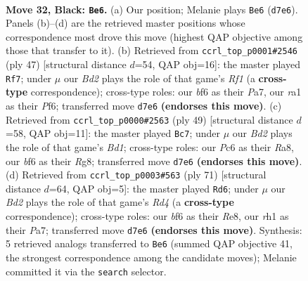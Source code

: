 \documentclass[11pt]{article}
\begin{document}
\clearpage

\begin{figure}[p]\centering
\begin{subfigure}{0.46\textwidth}\centering
\resizebox{\linewidth}{!}{%
\newchessgame
\chessboard[
  setfen={2r1kb2/p1pb1p1r/P1p2Bp1/2P4p/1P3P1P/8/8/RN2K2R b Q - 12 32},
  showmover=false,
  pgfstyle=straightmove, color=movearrow, markmove={d7-e6}
]}
\caption{}
\end{subfigure}\hfill
\begin{subfigure}{0.46\textwidth}\centering
\resizebox{\linewidth}{!}{%
\newchessgame
\chessboard[
  setfen={5rk1/pp6/5pp1/P1pr3p/3b3P/R2P2P1/1PP3K1/2B1R3 b - - 1 24},
  showmover=false,
  pgfstyle=straightmove, color=movearrow, markmove={f8-f7}
]}
\caption{}
\end{subfigure}
\\[4pt]
\begin{subfigure}{0.46\textwidth}\centering
\resizebox{\linewidth}{!}{%
\newchessgame
\chessboard[
  setfen={r2b2r1/4kppp/2bpp3/p6P/N1PBP1P1/1P3P2/5K2/R2R4 b - - 0 25},
  showmover=false,
  pgfstyle=straightmove, color=movearrow, markmove={d8-c7}
]}
\caption{}
\end{subfigure}\hfill
\begin{subfigure}{0.46\textwidth}\centering
\resizebox{\linewidth}{!}{%
\newchessgame
\chessboard[
  setfen={4r3/p1bk4/P5p1/n1prppPp/2P4P/N3BP2/1PK1R3/4R3 b - - 0 36},
  showmover=false,
  pgfstyle=straightmove, color=movearrow, markmove={d5-d6}
]}
\caption{}
\end{subfigure}
\caption{\textbf{Move 32, Black: \texttt{Be6}.} (a) Our position; Melanie plays \texttt{Be6} (\texttt{d7e6}). Panels (b)--(d) are the retrieved master positions whose correspondence most drove this move (highest QAP objective among those that transfer to it). (b) Retrieved from \texttt{ccrl\_top\_p0001\#2546} (ply 47) [structural distance $d$=54, QAP obj=16]: the master played \texttt{Rf7}; under $\mu$ our \emph{Bd2} plays the role of that game's \emph{Rf1} (a \textbf{cross-type} correspondence); cross-type roles: our \emph{b}f6 as their \emph{P}a7, our \emph{r}a1 as their \emph{P}f6; transferred move \texttt{d7e6} \textbf{(endorses this move)}. (c) Retrieved from \texttt{ccrl\_top\_p0000\#2563} (ply 49) [structural distance $d$=58, QAP obj=11]: the master played \texttt{Bc7}; under $\mu$ our \emph{Bd2} plays the role of that game's \emph{Bd1}; cross-type roles: our \emph{P}c6 as their \emph{R}a8, our \emph{b}f6 as their \emph{R}g8; transferred move \texttt{d7e6} \textbf{(endorses this move)}. (d) Retrieved from \texttt{ccrl\_top\_p0003\#563} (ply 71) [structural distance $d$=64, QAP obj=5]: the master played \texttt{Rd6}; under $\mu$ our \emph{Bd2} plays the role of that game's \emph{Rd4} (a \textbf{cross-type} correspondence); cross-type roles: our \emph{b}f6 as their \emph{R}e8, our \emph{r}h1 as their \emph{P}a7; transferred move \texttt{d7e6} \textbf{(endorses this move)}. Synthesis: 5 retrieved analogs transferred to \texttt{Be6} (summed QAP objective 41, the strongest correspondence among the candidate moves); Melanie committed it via the \texttt{search} selector.}
\label{fig:thought-m63}
\end{figure}
\end{document}

